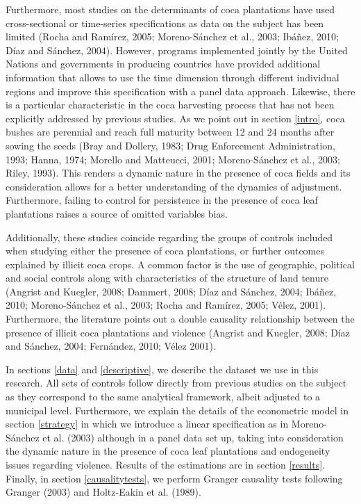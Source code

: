 Furthermore, most studies on the determinants of coca plantations have used cross-sectional or time-series specifications as data on the subject has been limited (Rocha and Ram\'{i}rez, 2005; Moreno-S\'{a}nchez et al., 2003; Ib\'{a}\~{n}ez, 2010; D\'{i}az and S\'{a}nchez, 2004). However, programs implemented jointly by the United Nations and governments in producing countries have provided additional information that allows to use the time dimension through different individual regions and improve this specification with a panel data approach. Likewise, there is a particular characteristic in the coca harvesting process that has not been explicitly addressed by previous studies. As we point out in section \ref{intro}, coca bushes are perennial and reach full maturity between 12 and 24 months after sowing the seeds (Bray and Dollery, 1983; Drug Enforcement Administration, 1993; Hanna, 1974; Morello and Matteucci, 2001; Moreno-S\'{a}nchez et al., 2003; Riley, 1993). This renders a dynamic nature in the presence of coca fields and its consideration allows for a better understanding of the dynamics of adjustment. Furthermore, failing to control for persistence in the presence of coca leaf plantations raises a source of omitted variables bias.

Additionally, these studies coincide regarding the groups of controls included when studying either the presence of coca plantations, or further outcomes explained by illicit coca crops. A common factor is the use of geographic, political and social controls along with characteristics of the structure of land tenure (Angrist and Kuegler, 2008; Dammert, 2008; D\'{i}az and S\'{a}nchez, 2004; Ib\'{a}\~{n}ez, 2010; Moreno-S\'{a}nchez et al., 2003; Rocha and Ram\'{i}rez, 2005; V\'{e}lez, 2001). Furthermore, the literature points out a double causality relationship between the presence of illicit coca plantations and violence (Angrist and Kuegler, 2008; D\'{i}az and S\'{a}nchez, 2004; Fern\'{a}ndez, 2010; V\'{e}lez 2001). 

In sections \ref{data} and \ref{descriptive}, we describe the dataset we use in this research. All sets of controls follow directly from previous studies on the subject as they correspond to the same analytical framework, albeit adjusted to a municipal level. Furthermore, we explain the details of the econometric model in section \ref{strategy} in which we introduce a linear specification as in Moreno-S\'{a}nchez et al. (2003) although in a panel data set up, taking into consideration the dynamic nature in the presence of coca leaf plantations and endogeneity issues regarding violence. Results of the estimations are in section \ref{results}. Finally, in section \ref{causalitytests}, we perform Granger causality tests following Granger (2003) and Holtz-Eakin et al. (1989).

